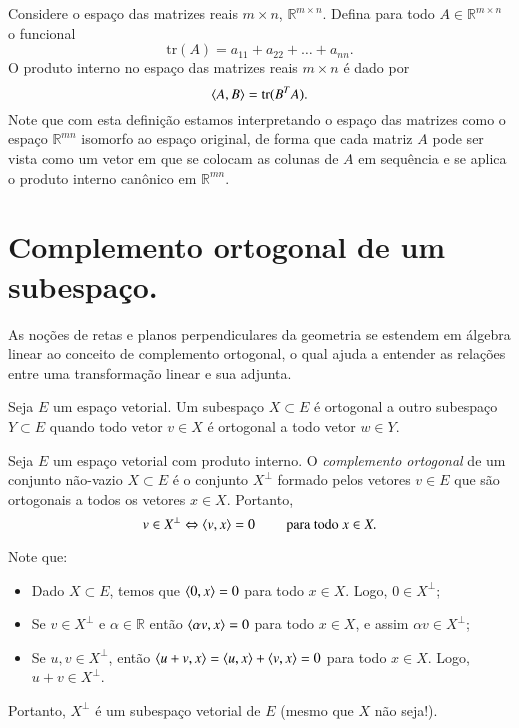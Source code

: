 \begin{exemplo*}
  Considere o espaço das matrizes reais $m\times n$, ${\mathbb{R}}^{m\times n}$. Defina para todo $A\in {\mathbb{R}}^{m\times n}$ o funcional
  \begin{equation*}
    \text{tr}(A) = a_{11} + a_{22} + \ldots + a_{nn}.
  \end{equation*}
  O produto interno no espaço das matrizes reais $m\times n$ é dado por
  \begin{equation*}
    \langle A, B \rangle = \text{tr}(B^TA).
  \end{equation*}
  Note que com esta definição estamos interpretando o espaço das matrizes como o espaço ${\mathbb{R}}^{mn}$ isomorfo ao espaço original, de forma que cada matriz $A$ pode ser vista como um vetor em que se colocam as colunas de $A$ em sequência e se aplica o produto interno canônico em ${\mathbb{R}}^{mn}$.
\end{exemplo*}

\section{Complemento ortogonal de um subespaço.}

As noções de retas e planos perpendiculares da geometria se estendem em álgebra linear ao conceito de complemento ortogonal, o qual ajuda a entender as relações entre uma transformação linear e sua adjunta.

Seja $E$ um espaço vetorial. Um subespaço $X\subset E$ é ortogonal a outro subespaço $Y\subset E$ quando todo vetor $v\in X$ é ortogonal a todo vetor $w\in Y$.

\begin{defi}
  Seja $E$ um espaço vetorial com produto interno. O \emph{complemento ortogonal} de um conjunto não-vazio $X\subset E$ é o conjunto $X^{\perp}$ formado pelos vetores $v\in E$ que são ortogonais a todos os vetores $x\in X$. Portanto,
  \begin{equation*}
    v\in X^{\perp} \Leftrightarrow \langle v, x \rangle=0 \qquad \mbox{ para todo } x\in X.
  \end{equation*}
\end{defi}

Note que:
\begin{itemize}
\item Dado $X\subset E$, temos que $\langle 0, x \rangle=0$ para todo $x\in X$. Logo, $0\in X^{\perp}$;
\item Se $v\in X^{\perp}$ e $\alpha \in {\mathbb{R}}$ então $\langle \alpha v, x \rangle=0$ para todo $x\in X$, e assim $\alpha v\in X^{\perp}$;
\item Se $u,v\in X^{\perp}$, então $\langle u+v, x \rangle=\langle u, x \rangle+\langle v, x \rangle=0$ para todo $x\in X$. Logo, $u+v\in X^{\perp}$.
\end{itemize}
Portanto, $X^{\perp}$ é um subespaço vetorial de $E$ (mesmo que $X$ não seja!).

